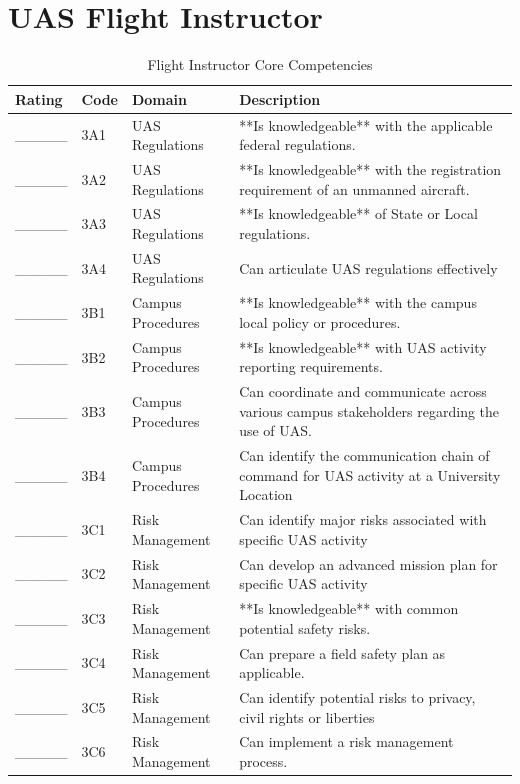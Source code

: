 \documentclass[
]{book}
\begin{document}
\hypertarget{uas-flight-instructor}{%
\section{UAS Flight Instructor}\label{uas-flight-instructor}}

\begin{longtable}[t]{lll>{\raggedright\arraybackslash}p{25em}}
\caption{\label{tab:unnamed-chunk-11}Flight Instructor Core Competencies}\\
\toprule
Rating & Code & Domain & Description\\
\midrule
\_\_\_\_\_ & 3A1 & UAS Regulations & **Is knowledgeable** with the applicable federal regulations.\\
\_\_\_\_\_ & 3A2 & UAS Regulations & **Is knowledgeable** with the registration requirement of an unmanned aircraft.\\
\_\_\_\_\_ & 3A3 & UAS Regulations & **Is knowledgeable** of State or Local regulations.\\
\_\_\_\_\_ & 3A4 & UAS Regulations & Can articulate UAS regulations effectively\\
\_\_\_\_\_ & 3B1 & Campus Procedures & **Is knowledgeable** with the campus local policy or procedures.\\
\addlinespace
\_\_\_\_\_ & 3B2 & Campus Procedures & **Is knowledgeable** with UAS activity reporting requirements.\\
\_\_\_\_\_ & 3B3 & Campus Procedures & Can coordinate and communicate across various campus stakeholders regarding the use of UAS.\\
\_\_\_\_\_ & 3B4 & Campus Procedures & Can identify the communication chain of command for UAS activity at a University Location\\
\_\_\_\_\_ & 3C1 & Risk Management & Can identify major risks associated with specific UAS activity\\
\_\_\_\_\_ & 3C2 & Risk Management & Can develop an advanced mission plan for specific UAS activity\\
\addlinespace
\_\_\_\_\_ & 3C3 & Risk Management & **Is knowledgeable** with common potential safety risks.\\
\_\_\_\_\_ & 3C4 & Risk Management & Can prepare a field safety plan as applicable.\\
\_\_\_\_\_ & 3C5 & Risk Management & Can identify potential risks to privacy, civil rights or liberties\\
\_\_\_\_\_ & 3C6 & Risk Management & Can implement a risk management process.\\

\end{longtable}
\end{document}

